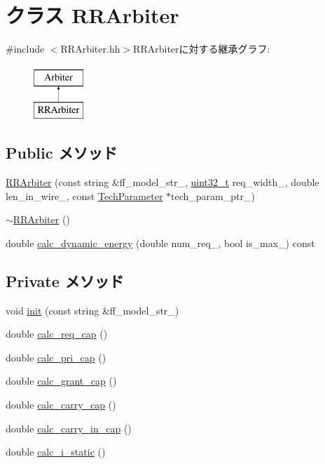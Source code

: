 \hypertarget{classRRArbiter}{
\section{クラス RRArbiter}
\label{classRRArbiter}
}


{\ttfamily \#include $<$RRArbiter.hh$>$}RRArbiterに対する継承グラフ:\begin{figure}[H]
\begin{center}
\leavevmode
\includegraphics[height=2cm]{classRRArbiter}
\end{center}
\end{figure}
\subsection*{Public メソッド}
\begin{DoxyCompactItemize}
\item 
\hyperlink{classRRArbiter_a87e05ea60c9d10abe5a0195f10ae2585}{RRArbiter} (const string \&ff\_\-model\_\-str\_\-, \hyperlink{Type_8hh_a435d1572bf3f880d55459d9805097f62}{uint32\_\-t} req\_\-width\_\-, double len\_\-in\_\-wire\_\-, const \hyperlink{classTechParameter}{TechParameter} $\ast$tech\_\-param\_\-ptr\_\-)
\item 
\hyperlink{classRRArbiter_a04a00082f0532adf4a3228317836eb6e}{$\sim$RRArbiter} ()
\item 
double \hyperlink{classRRArbiter_adf7ecbfcfee50be4847889bf0bc725b1}{calc\_\-dynamic\_\-energy} (double num\_\-req\_\-, bool is\_\-max\_\-) const 
\end{DoxyCompactItemize}
\subsection*{Private メソッド}
\begin{DoxyCompactItemize}
\item 
void \hyperlink{classRRArbiter_aa30ab0383b17214d69595df443fe4223}{init} (const string \&ff\_\-model\_\-str\_\-)
\item 
double \hyperlink{classRRArbiter_ad328bcd6c4435aff24a79afd9ac8b978}{calc\_\-req\_\-cap} ()
\item 
double \hyperlink{classRRArbiter_ab7379d0e829c19b19c699f8bca018b9d}{calc\_\-pri\_\-cap} ()
\item 
double \hyperlink{classRRArbiter_a1ca031abb0d310b02168d439e1e858d2}{calc\_\-grant\_\-cap} ()
\item 
double \hyperlink{classRRArbiter_a2f477f24564e2e59b52b6ae201bb6170}{calc\_\-carry\_\-cap} ()
\item 
double \hyperlink{classRRArbiter_a664fec3f5e3d085af117c292b371162e}{calc\_\-carry\_\-in\_\-cap} ()
\item 
double \hyperlink{classRRArbiter_a0027807356ac4ca07fe2e593234eb884}{calc\_\-i\_\-static} ()
\end{DoxyCompactItemize}
